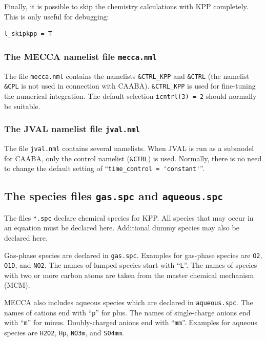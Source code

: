 \documentclass[twoside]{article}
\begin{document}
Finally, it is possible to skip the chemistry calculations with KPP
completely. This is only useful for debugging:

\begin{verbatim}
l_skipkpp = T
\end{verbatim}

\subsubsection{The MECCA namelist file {\tt mecca.nml}}
\label{sec:mecca_nml}

The file \verb|mecca.nml| contains the namelists \verb|&CTRL_KPP| and
\verb|&CTRL| (the namelist \verb|&CPL| is not used in connection with
CAABA). \verb|&CTRL_KPP| is used for fine-tuning the numerical
integration. The default selection \verb|icntrl(3) = 2| should normally
be suitable.

\subsubsection{The JVAL namelist file {\tt jval.nml}}
\label{sec:jval_nml}

The file {\tt jval.nml} contains several namelists. When JVAL is run as
a submodel for CAABA, only the control namelist (\verb|&CTRL|) is used.
Normally, there is no need to change the default setting of
``\verb|time_control = 'constant'|''.

\subsection{The species files {\tt gas.spc} and {\tt aqueous.spc}}
\label{sec:spcfiles}

The files \verb|*.spc| declare chemical species for KPP. All species
that may occur in an equation must be declared here. Additional dummy
species may also be declared here.

Gas-phase species are declared in \verb|gas.spc|. Examples for gas-phase
species are \verb|O2|, \verb|O1D|, and \verb|NO2|. The names of lumped
species start with ``\verb|L|''. The names of species with two or more
carbon atoms are taken from the master chemical mechanism (MCM).

MECCA also includes aqueous species which are declared in
\verb|aqueous.spc|. The names of cations end with ``\verb|p|'' for plus.
The names of single-charge anions end with ``\verb|m|'' for minus.
Doubly-charged anions end with ``\verb|mm|''. Examples for aqueous
species are \verb|H2O2|, \verb|Hp|, \verb|NO3m|, and \verb|SO4mm|.
\end{document}
